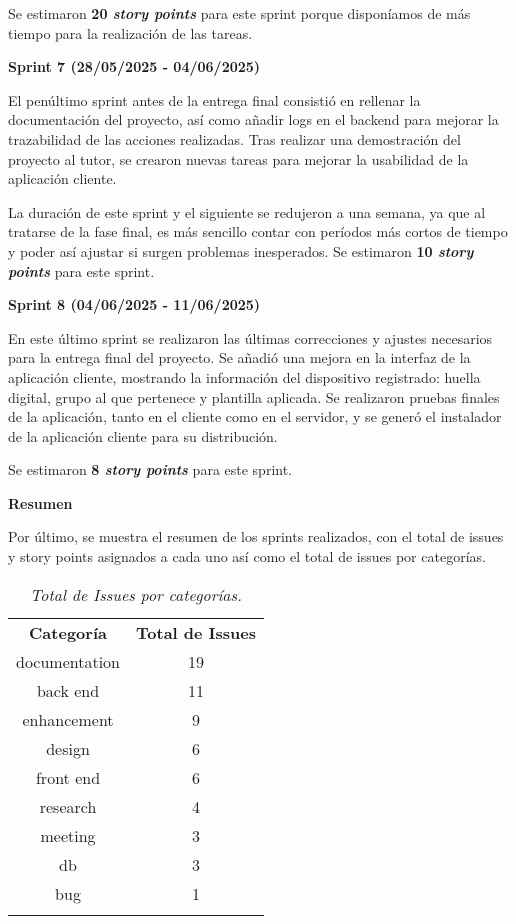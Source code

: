 Se estimaron \textbf{20 \textit{story points}} para este sprint porque disponíamos de más tiempo para la realización de las
tareas.

\textbf{Sprint 7 (28/05/2025 - 04/06/2025)}

El penúltimo sprint antes de la entrega final consistió en rellenar la documentación del proyecto, así como añadir
logs en el backend para mejorar la trazabilidad de las acciones realizadas.
Tras realizar una demostración del proyecto al tutor, se crearon nuevas tareas para mejorar la usabilidad de la
aplicación cliente.

La duración de este sprint y el siguiente se redujeron a una semana, ya que al tratarse de la fase final, es más sencillo
contar con períodos más cortos de tiempo y poder así ajustar si surgen problemas inesperados.
Se estimaron \textbf{10 \textit{story points}} para este sprint.

\textbf{Sprint 8 (04/06/2025 - 11/06/2025)}

En este último sprint se realizaron las últimas correcciones y ajustes necesarios para la entrega final del proyecto.
Se añadió una mejora en la interfaz de la aplicación cliente, mostrando la información del dispositivo registrado:
huella digital, grupo al que pertenece y plantilla aplicada.
Se realizaron pruebas finales de la aplicación, tanto en el cliente como en el servidor, y se generó el instalador
de la aplicación cliente para su distribución.

Se estimaron \textbf{8 \textit{story points}} para este sprint.

\textbf{Resumen}

Por último, se muestra el resumen de los sprints realizados, con el total de issues y story points asignados a cada uno
así como el total de issues por categorías.

\begin{table}[H]
    \centering
    \begin{tabular}{| c | c |}
        \Xhline{2\arrayrulewidth}
        \textbf{Categoría} & \textbf{Total de Issues} \\ \Xhline{2\arrayrulewidth}
        documentation & 19 \\ \hline
        back end & 11 \\ \hline
        enhancement & 9 \\ \hline
        design & 6 \\ \hline
        front end & 6 \\ \hline
        research & 4 \\ \hline
        meeting & 3 \\ \hline
        db & 3 \\ \hline
        bug & 1 \\ \hline
        \Xhline{2\arrayrulewidth}
    \end{tabular}
    \caption{\textit{Total de Issues por categorías.}}
\end{table}

